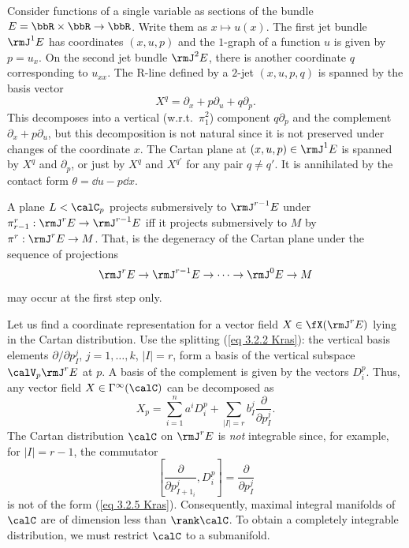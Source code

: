 \begin{example}
    Consider functions of a single variable as sections of the bundle $E=\bbR\times\bbR\to \bbR$. Write them as $x\mapsto u(x)$. The first jet bundle $\rmJ^1 E$ has coordinates $(x,u,p)$ and the $1$-graph of a function $u$ is given by $p=u_x$. On the second jet bundle $\rmJ^2 E$, there is another coordinate $q$ corresponding to $u_{xx}$. The R-line defined by a $2$-jet $(x,u,p,q)$ is spanned by the basis vector 
    \[X^q=\partial_x+p\partial_u+q\partial_p.\]
    This decomposes into a vertical (w.r.t.\ $\pi^2_1$) component $q\partial_p$ and the complement $\partial_x+p\partial_u$, but this decomposition is not natural since it is not preserved under changes of the coordinate $x$. The Cartan plane at $(x,u,p)\in\rmJ^1 E$ is spanned by $X^q$ and $\partial_p$, or just by $X^{q}$ and $X^{q'}$ for any pair $q\neq q'$. It is annihilated by the contact form $\theta=\dd u-p\dd x$.
\end{example}

\begin{cor}
    A plane $L<\calC_p$ projects submersively to $\rmJ^{r-1}E$ under $\pi^r_{r-1}:\rmJ^r E\to \rmJ^{r-1}E$ iff it projects submersively to $M$ by $\pi^r:\rmJ^r E\to M$. That, is the degeneracy of the Cartan plane under the sequence of projections 
    \[\rmJ^r E\to \rmJ^{r-1}E\to\cdots\to \rmJ^0 E\to M\] 
    may occur at the first step only.
\end{cor}

Let us find a coordinate representation for a vector field $X\in\fX(\rmJ^r E)$ lying in the Cartan distribution. Use the splitting (\ref{eq 3.2.2 Kras}): the vertical basis elements $\partial/\partial p_I^j$, $j=1,\ldots,k$, $|I|=r$, form a basis of the vertical subspace $\calV_p\rmJ^r E$ at $p$. A basis of the complement is given by the vectors $D^p_i$. Thus, any vector field $X\in\Gamma^\infty(\calC)$ can be decomposed as 
\[X_p=\sum_{i=1}^n a^i D_i^p+\sum_{|I|=r}b^j_I \frac{\partial}{\partial p^j_I}.\label{eq 3.2.5 Kras}\]
The Cartan distribution $\calC$ on $\rmJ^r E$ is \emph{not} integrable since, for example, for $|I|=r-1$, the commutator 
\[\left[\frac{\partial}{\partial p^j_{I+1_i}},D_i^p\right]=\frac{\partial}{\partial p^j_I}\]
is not of the form (\ref{eq 3.2.5 Kras}). Consequently, maximal integral manifolds of $\calC$ are of dimension less than $\rank \calC$. To obtain a completely integrable distribution, we must restrict $\calC$ to a submanifold.

